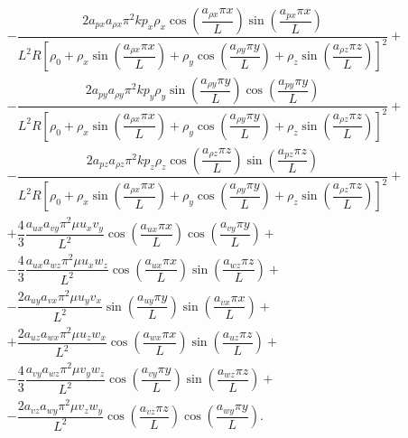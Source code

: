 \documentclass[10pt]{article}
\begin{document}
\begin{landscape}
\begin{equation*}
\begin{split}
&-  \dfrac{2 a_{px} a_{\rho x} \pi^2 k p_x \rho_x \cos\left(\dfrac{a_{\rho x} \pi x}{L}\right) \sin\left(\dfrac{a_{px} \pi x}{L}\right)}{L^2 R \left[\rho_0+\rho_x \sin\left(\dfrac{a_{\rho x} \pi x}{L}\right)+\rho_y \cos\left(\dfrac{a_{\rho y} \pi y}{L}\right)+\rho_z \sin\left(\dfrac{a_{\rho z} \pi z}{L}\right)\right]^2} + \\
%
&- \dfrac{2 a_{py} a_{\rho y} \pi^2 k p_y  \rho_y\sin\left(\dfrac{a_{\rho y} \pi y}{L}\right) \cos\left(\dfrac{a_{py} \pi y}{L}\right)  }{L^2 R \left[\rho_0+\rho_x \sin\left(\dfrac{a_{\rho x} \pi x}{L}\right)+\rho_y \cos\left(\dfrac{a_{\rho y} \pi y}{L}\right)+\rho_z \sin\left(\dfrac{a_{\rho z} \pi z}{L}\right)\right]^2} +\\
%
&-  \dfrac{2 a_{pz} a_{\rho z} \pi^2 k p_z \rho_z\cos\left(\dfrac{a_{\rho z} \pi z}{L}\right) \sin\left(\dfrac{a_{pz} \pi z}{L}\right) }{L^2 R \left[\rho_0+\rho_x \sin\left(\dfrac{a_{\rho x} \pi x}{L}\right)+\rho_y \cos\left(\dfrac{a_{\rho y} \pi y}{L}\right)+\rho_z \sin\left(\dfrac{a_{\rho z} \pi z}{L}\right)\right]^2}+\\
%
&+\dfrac{4}{3}   \dfrac{ a_{ux} a_{vy} \pi^2\mu u_x v_y}{L^2} \cos\left(\dfrac{a_{ux} \pi x}{L}\right) \cos\left(\dfrac{a_{vy} \pi y}{L}\right)+ \\
%
&-\dfrac{4}{3}   \dfrac{a_{ux} a_{wz} \pi^2 \mu u_x w_z}{L^2}\cos\left(\dfrac{a_{ux} \pi x}{L}\right) \sin\left(\dfrac{a_{wz} \pi z}{L}\right) + \\
%
&-\dfrac{2 a_{uy} a_{vx} \pi^2  \mu u_y v_x }{L^2} \sin\left(\dfrac{a_{uy} \pi y}{L}\right) \sin\left(\dfrac{a_{vx} \pi x}{L}\right)+ \\
%
&+\dfrac{2 a_{uz} a_{wx} \pi^2 \mu u_z w_x }{L^2}\cos\left(\dfrac{a_{wx} \pi x}{L}\right) \sin\left(\dfrac{a_{uz} \pi z}{L}\right)+\\
%
&-\dfrac{4}{3}  \dfrac{a_{vy} a_{wz} \pi^2\mu v_y w_z }{L^2}\cos\left(\dfrac{a_{vy} \pi y}{L}\right) \sin\left(\dfrac{a_{wz} \pi z}{L}\right)  + \\
%
&- \dfrac{2  a_{vz} a_{wy} \pi^2\mu v_z w_y}{L^2} \cos\left(\dfrac{a_{vz} \pi z}{L}\right) \cos\left(\dfrac{a_{wy} \pi y}{L}\right) .
\end{split}
\end{equation*}


\end{landscape}
\end{document}
